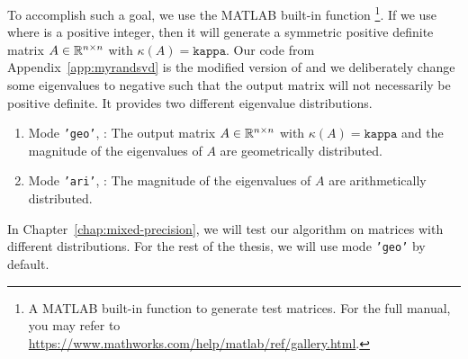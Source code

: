 To accomplish such a goal, we use the MATLAB built-in function \footnote{A MATLAB built-in function to generate test matrices. For the full manual, you may refer to \url{https://www.mathworks.com/help/matlab/ref/gallery.html}.}. If we use  where  is a positive integer, then it will generate a symmetric positive definite matrix $A\in\mathbb{R}^{n\times n}$ with $\kappa(A) = \mathtt{kappa}$. Our code  from Appendix~\ref{app:myrandsvd} is the modified version of  and we deliberately change some eigenvalues to negative such that the output matrix will not necessarily be positive definite. It provides two different eigenvalue distributions.
\begin{enumerate}
  \item Mode \texttt{'geo'}, : The output matrix $A\in\mathbb{R}^{n\times n}$ with $\kappa(A) = \mathtt{kappa}$ and the magnitude of the eigenvalues of $A$ are geometrically distributed.
  \item Mode \texttt{'ari'}, : The magnitude of the eigenvalues of $A$ are arithmetically distributed.
\end{enumerate}

In Chapter~\ref{chap:mixed-precision}, we will test our algorithm on matrices with different distributions. For the rest of the thesis, we will use mode \texttt{'geo'} by default.